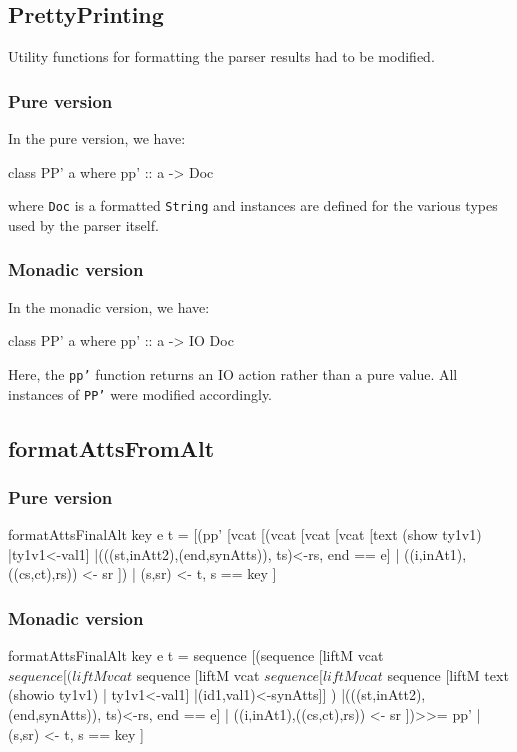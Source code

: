 \documentclass[../main.tex]{subfiles}
\begin{document}
\subsection{PrettyPrinting}
Utility functions for formatting the parser results had to be modified.

\subsubsection{Pure version}
In the pure version, we have:

\begin{code}
class PP' a where
pp' :: a -> Doc
\end{code}

where \texttt{Doc} is a formatted \texttt{String} and instances are defined for the various types
used by the parser itself.

\subsubsection{Monadic version}

In the monadic version, we have:

\begin{code}
class PP' a where
pp' :: a -> IO Doc
\end{code}

Here, the \texttt{pp'} function returns an IO action rather than a pure value.
All instances of \texttt{PP'} were modified accordingly.

\subsection{formatAttsFromAlt}

\subsubsection{Pure version}
\begin{code}
formatAttsFinalAlt  key e t  =
[(pp' [vcat [(vcat [vcat [vcat [text (show ty1v1)  |ty1v1<-val1]
|(((st,inAtt2),(end,synAtts)), ts)<-rs, end == e]                             
| ((i,inAt1),((cs,ct),rs)) <- sr ])
| (s,sr) <- t, s == key ] 

\end{code}

\subsubsection{Monadic version}
\begin{code}
formatAttsFinalAlt  key e t  =
sequence [(sequence [liftM vcat $ sequence
[(liftM vcat $ sequence
[liftM vcat $ sequence
[liftM vcat $ sequence
[liftM text (showio ty1v1) | ty1v1<-val1]
|(id1,val1)<-synAtts]] )
|(((st,inAtt2),(end,synAtts)), ts)<-rs, end == e]
| ((i,inAt1),((cs,ct),rs)) <- sr ])>>= pp'
| (s,sr) <- t, s == key ]
\end{code}
\end{document}
